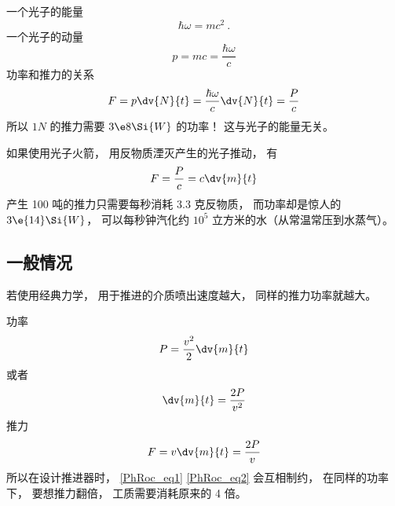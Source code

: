 
\begin{issues}
\issueDraft
\end{issues}

一个光子的能量
\begin{equation}
\hbar\omega = mc^2~.
\end{equation}
一个光子的动量
\begin{equation}
p = mc = \frac{\hbar\omega}{c}
\end{equation}
功率和推力的关系
\begin{equation}
F = p \dv{N}{t} = \frac{\hbar\omega}{c}\dv{N}{t} = \frac{P}{c}
\end{equation}
所以 $1N$ 的推力需要 $3\e8\Si{W}$ 的功率！ 这与光子的能量无关。

如果使用光子火箭， 用反物质湮灭产生的光子推动， 有
\begin{equation}
F = \frac{P}{c} = c\dv{m}{t}
\end{equation}
产生 100 吨的推力只需要每秒消耗 3.3 克反物质， 而功率却是惊人的 $3\e{14}\Si{W}$， 可以每秒钟汽化约 $10^5$ 立方米的水（从常温常压到水蒸气）。

\subsection{一般情况}
若使用经典力学， 用于推进的介质喷出速度越大， 同样的推力功率就越大。

功率
\begin{equation}
P = \frac{v^2}{2}\dv{m}{t}
\end{equation}
或者
\begin{equation}\label{PhRoc_eq1}
\dv{m}{t} = \frac{2P}{v^2}
\end{equation}
推力
\begin{equation}\label{PhRoc_eq2}
F = v\dv{m}{t} = \frac{2P}{v}
\end{equation}
所以在设计推进器时， \autoref{PhRoc_eq1} \autoref{PhRoc_eq2} 会互相制约， 在同样的功率下， 要想推力翻倍， 工质需要消耗原来的 4 倍。

